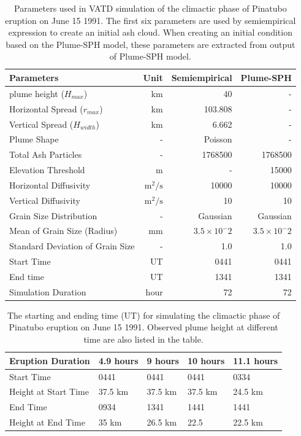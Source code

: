 \documentclass[utf8]{frontiersSCNS} %
\begin{document}
\begin{table}[htp]
\centering
\caption{Parameters used in VATD simulation of the climactic phase of Pinatubo eruption on June 15 1991. The first six parameters are used by semiempirical expression to create an initial ash cloud. When creating an initial condition based on the Plume-SPH model, these parameters are extracted from output of Plume-SPH model.}
	 \begin{tabular}{lrrr}
	 \hline
	 Parameters & Unit & Semiempirical & Plume-SPH \\
	 \hline
	 plume height ($H_{max}$) & km & 40 & - \\ 
	 Horizontal Spread ($r_{max}$) & km & 103.808 & -\\
	 Vertical Spread ($H_{width}$) & km & 6.662 & - \\
	 Plume Shape & - & Poisson & - \\
	 Total Ash Particles & - & 1768500 & 1768500 \\
	 Elevation Threshold & m & - & 15000 \\
	 Horizontal Diffusivity & $\mathrm{m}^2/\mathrm{s}$ &10000 & 10000\\
	 Vertical Diffusivity & $\mathrm{m}^2/\mathrm{s}$ & 10 & 10 \\
	 Grain Size Distribution & - & Gaussian & Gaussian \\
	 Mean of Grain Size (Radius) & mm & $3.5 \times 10 ^-2$ & $3.5 \times 10 ^-2$ \\
	 Standard Deviation of Grain Size & - & 1.0 & 1.0 \\
	 	Start Time & UT & 0441 & 0441 \\
	 End time & UT & 1341 & 1341 \\
	 Simulation Duration & hour & 72 & 72 \\
	 \hline
	 \end{tabular}
	 \label{tab:input_parameter_Puff_simulation}
\end{table}

\begin{table}[htp]
\centering
\caption{The starting and ending time (UT) for simulating the climactic phase of Pinatubo eruption on June 15 1991. Observed plume height \citep{holasek1996satellite} at different time are also listed in the table.}		
	 \begin{tabular}{p{35mm}p{20mm}p{20mm}p{20mm}p{20mm}}
	 \hline
Eruption Duration & 4.9 hours & 9 hours & 10 hours & 11.1 hours \\
	 \hline
	 Start Time & 0441 & 0441 & 0441 & 0334 \\
	 Height at Start Time & 37.5 km & 37.5 km & 37.5 km & 24.5 km \\
	
	 End Time & 0934 & 1341 & 1441 & 1441 \\
	 Height at End Time & 35 km & 26.5 km & 22.5 & 22.5 km \\
	 \hline
	 \end{tabular}
	 \label{tab:Pinatubo-eruption-duration}
\end{table}
\end{document}

